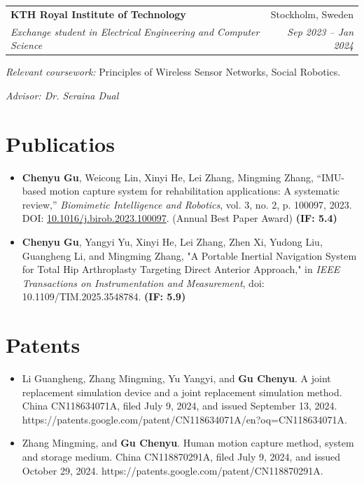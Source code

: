 \documentclass[letterpaper,11pt]{article}
\makeatletter
\newcommand{\resumeItem}[1]{
  \item\small{
    {#1 \vspace{-2pt}}
  }
}
\newcommand{\resumeSubheading}[4]{
  \vspace{-2pt}\item
    \begin{tabular*}{0.97\textwidth}[t]{l@{\extracolsep{\fill}}r}
      \textbf{#1} & #2 \\
      \textit{\small#3} & \textit{\small #4} \\
    \end{tabular*}\vspace{-7pt}
}
\newcommand{\resumeSubHeadingListEnd}{\end{itemize}}
\newcommand{\resumeItemListStart}{\begin{itemize}}
\newcommand{\resumeItemListEnd}{\end{itemize}\vspace{-5pt}}
\makeatother
\begin{document}
\resumeSubheading
{KTH Royal Institute of Technology}{Stockholm, Sweden}
{Exchange student in Electrical Engineering and Computer Science}{Sep 2023 -- Jan 2024}

\resumeItem{\small \textit{Relevant coursework:}
  Principles of Wireless Sensor Networks, Social Robotics.
}
\vspace{-5pt}
\resumeItem{\textit{Advisor: Dr. Seraina Dual}}
\vspace{1pt}


\section{Publicatios}
\vspace{3pt}
\resumeItemListStart
  \resumeItem{
    \textbf{Chenyu Gu}, Weicong Lin, Xinyi He, Lei Zhang, Mingming Zhang, “IMU-based motion capture system for rehabilitation applications: A systematic
    review,” \textit{Biomimetic Intelligence and Robotics}, vol. 3, no. 2, p. 100097, 2023. DOI: \href{https://doi.org/10.1016/j.birob.2023.100097}{10.1016/j.birob.2023.100097}. (Annual Best Paper Award) \textbf{(IF: 5.4)}
  }
  \resumeItem{
  \textbf{Chenyu Gu}, Yangyi Yu, Xinyi He, Lei Zhang, Zhen Xi, Yudong Liu, Guangheng Li, and Mingming Zhang, "A Portable Inertial Navigation System for Total Hip Arthroplasty Targeting Direct Anterior Approach," in \textit{IEEE Transactions on Instrumentation and Measurement}, doi: 10.1109/TIM.2025.3548784. \textbf{(IF: 5.9)}
  }
\resumeItemListEnd

\section{Patents}
\vspace{3pt}
\resumeItemListStart
  \resumeItem{
Li Guangheng, Zhang Mingming, Yu Yangyi, and \textbf{Gu Chenyu}. A joint replacement simulation device and a joint replacement simulation method. China CN118634071A, filed July 9, 2024, and issued September 13, 2024. https://patents.google.com/patent/CN118634071A/en?oq=CN118634071A.
  }
  \resumeItem{
    Zhang Mingming, and \textbf{Gu Chenyu}. Human motion capture method, system and storage medium. China CN118870291A, filed July 9, 2024, and issued October 29, 2024. https://patents.google.com/patent/CN118870291A.
  }
\resumeItemListEnd
\end{document}

